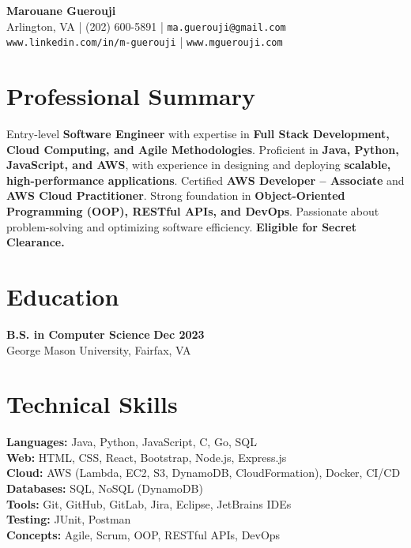 \documentclass[a4paper,10pt]{article}
\begin{document}
\pagestyle{empty}

\begin{center}
    {\huge \textbf{Marouane Guerouji}} \\[2pt]
    Arlington, VA \quad | \quad (202) 600-5891 \quad | \quad \texttt{ma.guerouji@gmail.com} \\ 
    \texttt{www.linkedin.com/in/m-guerouji} \quad | \quad \texttt{www.mguerouji.com}
\end{center}

\vspace{-3mm}

\section*{Professional Summary}
Entry-level \textbf{Software Engineer} with expertise in \textbf{Full Stack Development, Cloud Computing, and Agile Methodologies}. Proficient in \textbf{Java, Python, JavaScript, and AWS}, with experience in designing and deploying \textbf{scalable, high-performance applications}. Certified \textbf{AWS Developer – Associate} and \textbf{AWS Cloud Practitioner}. Strong foundation in \textbf{Object-Oriented Programming (OOP), RESTful APIs, and DevOps}. Passionate about problem-solving and optimizing software efficiency. \textbf{Eligible for Secret Clearance.}

\vspace{-3mm}

\section*{Education}
\textbf{B.S. in Computer Science} \hfill \textbf{Dec 2023} \\
George Mason University, Fairfax, VA 

\vspace{-3mm}

\section*{Technical Skills}
\textbf{Languages:} Java, Python, JavaScript, C, Go, SQL \\
\textbf{Web:} HTML, CSS, React, Bootstrap, Node.js, Express.js \\
\textbf{Cloud:} AWS (Lambda, EC2, S3, DynamoDB, CloudFormation), Docker, CI/CD \\
\textbf{Databases:} SQL, NoSQL (DynamoDB) \\
\textbf{Tools:} Git, GitHub, GitLab, Jira, Eclipse, JetBrains IDEs \\
\textbf{Testing:} JUnit, Postman \\
\textbf{Concepts:} Agile, Scrum, OOP, RESTful APIs, DevOps 
\end{document}
